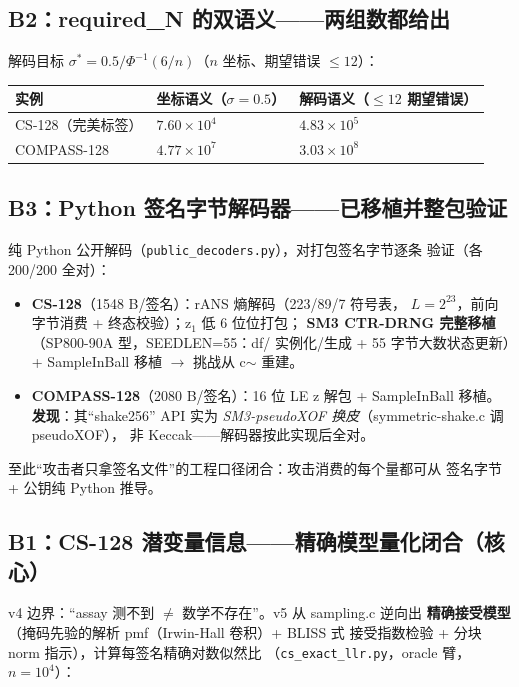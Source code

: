 \documentclass[11pt,a4paper]{ctexart}
\begin{document}
\subsection{B2：required\_N 的双语义——两组数都给出}

解码目标 $\sigma^*=0.5/\Phi^{-1}(6/n)$（$n$ 坐标、期望错误 $\le12$）：

\begin{table}[htbp]\centering\small
\begin{tabular}{@{}lll@{}}
\toprule
实例 & 坐标语义（$\sigma=0.5$） & 解码语义（$\le12$ 期望错误） \\
\midrule
CS-128（完美标签） & $7.60\times10^4$ & $4.83\times10^5$ \\
COMPASS-128 & $4.77\times10^7$ & $3.03\times10^8$ \\
\bottomrule
\end{tabular}
\end{table}

\subsection{B3：Python 签名字节解码器——已移植并整包验证}

纯 Python 公开解码（\texttt{public\_decoders.py}），对打包签名字节逐条
验证（各 200/200 全对）：

\begin{itemize}
  \item \textbf{CS-128}（1548 B/签名）：rANS 熵解码（223/89/7 符号表，
        $L=2^{23}$，前向字节消费 + 终态校验）；z$_1$ 低 6 位位打包；
        \textbf{SM3 CTR-DRNG 完整移植}（SP800-90A 型，SEEDLEN=55：df/
        实例化/生成 + 55 字节大数状态更新）+ SampleInBall 移植
        $\to$ 挑战从 c$\sim$ 重建。
  \item \textbf{COMPASS-128}（2080 B/签名）：16 位 LE z 解包 +
        SampleInBall 移植。\textbf{发现}：其``shake256'' API 实为
        \emph{SM3-pseudoXOF 换皮}（symmetric-shake.c 调 pseudoXOF），
        非 Keccak——解码器按此实现后全对。
\end{itemize}

至此``攻击者只拿签名文件''的工程口径闭合：攻击消费的每个量都可从
签名字节 + 公钥纯 Python 推导。

\subsection{B1：CS-128 潜变量信息——精确模型量化闭合（核心）}

v4 边界：``assay 测不到 $\neq$ 数学不存在''。v5 从 sampling.c 逆向出
\textbf{精确接受模型}（掩码先验的解析 pmf（Irwin-Hall 卷积）+ BLISS 式
接受指数检验 + 分块 norm 指示），计算每签名精确对数似然比
（\texttt{cs\_exact\_llr.py}，oracle 臂，$n{=}10^4$）：
\end{document}
